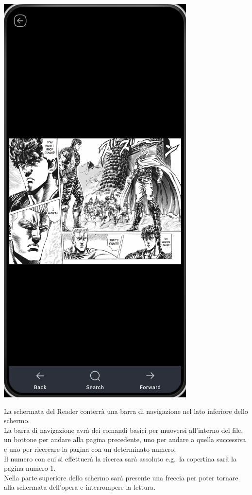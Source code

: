 \documentclass{report}
\newcommand{\ignore}[1]{}
\begin{document}
\begin{center}
   \includegraphics[scale=0.4]{reader.png}   
\end{center}

La schermata del Reader conterrà una barra di navigazione nel lato inferiore dello schermo.\\
La barra di navigazione avrà dei comandi basici per muoversi all'interno del file, un bottone per andare alla pagina precedente, uno per andare a quella successiva e uno per ricercare la pagina con un determinato numero.\\
Il numero con cui si effettuerà la ricerca sarà assoluto e.g.\ la copertina sarà la pagina numero 1.\\
Nella parte superiore dello schermo sarà presente una freccia per poter tornare alla \ignore{\hyperref[sec:home]{Library \- Home page}} schermata dell'opera e interrompere la lettura.
\end{document}

